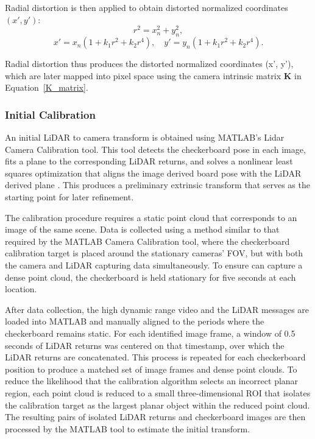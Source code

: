 \documentclass{erauthesis}
\begin{document}
Radial distortion is then applied to obtain distorted normalized coordinates $(x', y')$:
\begin{equation}
    r^2 = x_n^2 + y_n^2, 
\end{equation}
\begin{equation}
    x' = x_n \left(1 + k_1 r^2 + k_2 r^4\right),\quad
    y' = y_n \left(1 + k_1 r^2 + k_2 r^4\right).
\end{equation}

Radial distortion thus produces the distorted normalized coordinates (x', y'), which are later mapped into pixel space using the camera intrinsic matrix $\mathbf{K}$ in Equation~\ref{K_matrix}.

\subsubsection{Initial Calibration}
An initial LiDAR to camera transform is obtained using MATLAB’s Lidar Camera Calibration tool. This tool detects the checkerboard pose in each image, fits a plane to the corresponding LiDAR returns, and solves a nonlinear least squares optimization that aligns the image derived board pose with the LiDAR derived plane \cite{matlab_calibration}. This produces a preliminary extrinsic transform that serves as the starting point for later refinement.

The calibration procedure requires a static point cloud that corresponds to an image of the same scene. 
Data is collected using a method similar to that required by the MATLAB Camera Calibration tool, where the checkerboard calibration target is placed around the stationary cameras' \ac{FOV}, but with both the camera and LiDAR capturing data simultaneously. 
To ensure can capture a dense point cloud, the checkerboard is held stationary for five seconds at each location. 

After data collection, the high dynamic range video and the LiDAR messages are loaded into MATLAB and manually aligned to the periods where the checkerboard remains static. 
For each identified image frame, a window of 0.5 seconds of LiDAR returns was centered on that timestamp, over which the LiDAR returns are concatenated.
This process is repeated for each checkerboard position to produce a matched set of image frames and dense point clouds.
To reduce the likelihood that the calibration algorithm selects an incorrect planar region, each point cloud is reduced to a small three-dimensional \ac{ROI} that isolates the calibration target as the largest planar object within the reduced point cloud. The resulting pairs of isolated LiDAR returns and checkerboard images are then processed by the MATLAB tool to estimate the initial transform.
\end{document}

